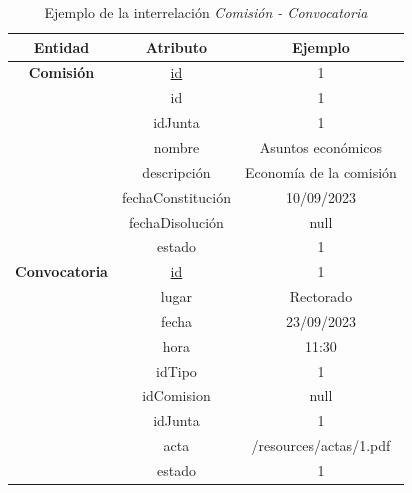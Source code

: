 \begin{itemize}
    \begin{table}[H]
    \centering
        \begin{tabular}{ | c | c | c |  }
             \hline
                 \textbf{Entidad} & \textbf{Atributo} & \textbf{Ejemplo}\\       
             \hline
                 \textbf{Comisión}  & \underline{id} & 1\\
                  & id & 1\\
                  & idJunta & 1\\
                  & nombre & Asuntos económicos\\
                  & descripción & Economía de la comisión\\
                  & fechaConstitución & 10/09/2023\\
                  & fechaDisolución & null\\
                  & estado & 1\\
              \hline
                  \textbf{Convocatoria}  & \underline{id} & 1\\
                  & lugar & Rectorado\\
                  & fecha & 23/09/2023\\
                  & hora & 11:30\\
                  & idTipo & 1\\
                  & idComision & null\\
                  & idJunta & 1\\
                  & acta & /resources/actas/1.pdf \\
                  & estado & 1\\
        \end{tabular}
        \caption{Ejemplo de la interrelación \textit{Comisión - Convocatoria}}
        \label{table:I-Com-Conv}
    \end{table}
\end{itemize}

